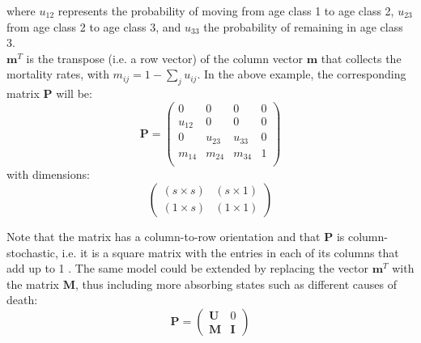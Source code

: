 \documentclass[\main/main.tex]{subfiles}
\begin{document}
where $ u_{12}$ represents the probability of moving from age class 1 to age class 2, $ u_{23}$ from age class 2 to age class 3, and $ u_{33}$ the probability of remaining in age class 3.\\
$ \mathbf{m}^T$ is the transpose (i.e. a row vector) of the column vector $\mathbf{m}$ that collects the mortality rates, with $m_{ij} = 1 - \sum_{j} u_{ij}$. 
In the above example, the corresponding matrix $\mathbf{P}$ will be:
\begin{equation}
    \mathbf{P}= \begin{pmatrix}
    0 & 0 & 0 & 0\\
    u_{12} & 0 & 0& 0\\
0 & u_{23} & u_{33}& 0\\
m_{14} & m_{24} & m_{34}& 1\\
    \end{pmatrix}
\end{equation}
with dimensions:
\begin{equation}
\begin{pmatrix}
    (s \times s) &  (s \times 1)\\
    (1 \times s) & (1 \times 1)
\end{pmatrix}
\end{equation}

\noindent Note that the matrix has a column-to-row orientation and that $\mathbf{P}$ is column-stochastic, i.e. it is a square matrix with the entries in each of its columns that add up to 1 \citep{Poole1995}. 
The same model could be extended by replacing the vector $\mathbf{m}^T$ with the matrix $\mathbf{M}$, thus including more absorbing states such as different causes of death:
\begin{equation}\label{matrixmodel}
    \mathbf{P} = \begin{pmatrix}
        \mathbf{U} &  0\\
    \mathbf{M}& \mathbf{I}
    \end{pmatrix}
\end{equation}
\end{document}
